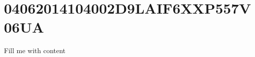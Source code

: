 \documentclass{article}
\begin{document}
\section{04062014104002D9LAIF6XXP557V06UA}
Fill me with content
\end{document}
